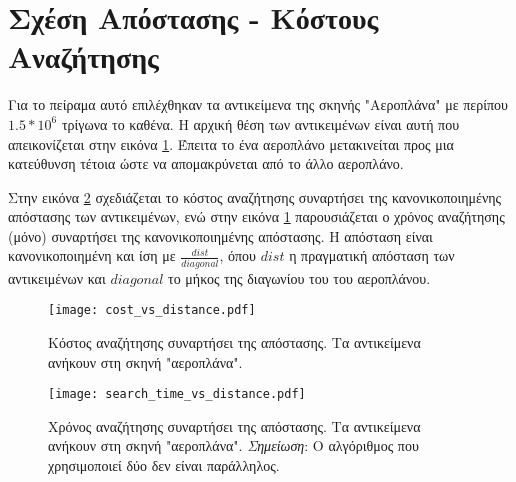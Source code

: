 \section{Σχέση Απόστασης - Κόστους Αναζήτησης}
Για το πείραμα αυτό επιλέχθηκαν τα αντικείμενα της σκηνής 
"Αεροπλάνα" με περίπου $1.5 * 10^6$ τρίγωνα το καθένα.
Η αρχική θέση των αντικειμένων είναι αυτή που απεικονίζεται 
στην εικόνα \ref{}.
Έπειτα το ένα αεροπλάνο μετακινείται 
προς μια κατεύθυνση τέτοια ώστε να απομακρύνεται 
από το άλλο αεροπλάνο.

Στην εικόνα \ref{fig:cost_metric_vs_distance} 
σχεδιάζεται το κόστος αναζήτησης συναρτήσει της 
κανονικοποιημένης απόστασης των αντικειμένων, 
ενώ στην εικόνα \ref{} παρουσιάζεται ο χρόνος 
αναζήτησης (μόνο) συναρτήσει της κανονικοποιημένης
απόστασης. 
Η απόσταση είναι κανονικοποιημένη και ίση με 
$\frac{dist}{diagonal}$, όπου $dist$ η πραγματική 
απόσταση των αντικειμένων και $diagonal$ το μήκος 
της διαγωνίου του  του αεροπλάνου.


\begin{figure}[H]
    \centering
    \texttt{[image: cost\_vs\_distance.pdf]}
    \caption[Κόστος Αναζήτησης Συναρτήσει της Απόστασης"] {
        Κόστος αναζήτησης συναρτήσει της απόστασης.
        Τα αντικείμενα ανήκουν στη σκηνή "αεροπλάνα".
    }
    \label{fig:cost_metric_vs_distance}
\end{figure}

\begin{figure}[H]
    \centering
    \texttt{[image: search\_time\_vs\_distance.pdf]}
    \caption[Χρόνος Αναζήτησης Συναρτήσει της Απόστασης"] {
        Χρόνος αναζήτησης συναρτήσει της απόστασης.
        Τα αντικείμενα ανήκουν στη σκηνή "αεροπλάνα".
        \textit{Σημείωση}: Ο αλγόριθμος που χρησιμοποιεί δύο  δεν 
        είναι παράλληλος.
    }
    \label{fig:cost_metric_vs_distance}
\end{figure}




